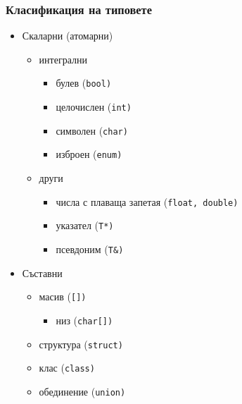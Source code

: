 \documentclass{beamer}
\begin{document}
\begin{frame}
  \frametitle{Класификация на типовете}
  \begin{itemize}
  \item Скаларни (атомарни)
    \begin{itemize}
    \item интегрални
      \begin{itemize}
      \item булев (\tt{bool})
      \item целочислен (\tt{int})
      \item символен (\tt{char})
      \item изброен (\tt{enum})
      \end{itemize}
    \item други
      \begin{itemize}
      \item числа с плаваща запетая (\tt{float}, \tt{double})
      \item указател (\tt{T*})
      \item псевдоним (\tt{T\&})
      \end{itemize}
    \end{itemize}
  \item Съставни
    \begin{itemize}
    \item масив (\tt{[]})
      \begin{itemize}
      \item низ (\tt{char[]})
      \end{itemize}
    \item структура (\tt{struct})
    \item клас (\tt{class})
    \item обединение (\tt{union})
    \end{itemize}
  \end{itemize}
\end{frame}
\end{document}
